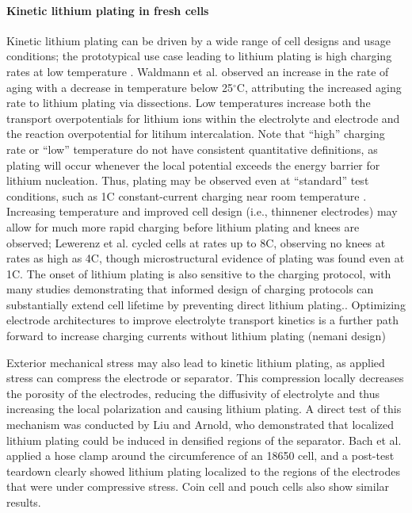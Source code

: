 \documentclass[journal=jpcl, manuscript=article, layout=onecolumn]{achemso}
\begin{document}
\paragraph{Kinetic lithium plating in fresh cells}
Kinetic lithium plating can be driven by a wide range of cell designs and usage conditions; the prototypical use case leading to lithium plating is high charging rates at low temperature \cite{waldmann_temperature_2014, petzl_lithium_2015}. Waldmann et al.\cite{waldmann_temperature_2014} observed an increase in the rate of aging with a decrease in temperature below 25$^{\circ}$C, attributing the increased aging rate to lithium plating via dissections. Low temperatures increase both the transport overpotentials for lithium ions within the electrolyte and electrode and the reaction overpotential for litihum intercalation. Note that ``high'' charging rate or ``low'' temperature do not have consistent quantitative definitions, as plating will occur whenever the local potential exceeds the energy barrier for lithium nucleation. Thus, plating may be observed even at ``standard'' test conditions, such as 1C constant-current charging near room temperature \cite{waldmann_optimization_2015,burns_-situ_2015}. Increasing temperature and improved cell design (i.e., thinnener electrodes) may allow for much more rapid charging before lithium plating and knees are observed; Lewerenz et al.\cite{lewerenz_systematic_2017} cycled cells at rates up to 8C, observing no knees at rates as high as 4C, though microstructural evidence of plating was found even at 1C. The onset of lithium plating is also sensitive to the charging protocol, with many studies demonstrating that informed design of charging protocols can substantially extend cell lifetime by preventing direct lithium plating.\cite{waldmann_optimization_2015,schindler_fast_2018}. Optimizing electrode architectures to improve electrolyte transport kinetics is a further path forward to increase charging currents without lithium plating \cite{usseglio-viretta_enabling_2020} (nemani design)

Exterior mechanical stress may also lead to kinetic lithium plating, as applied stress can compress the electrode or separator. This compression locally decreases the porosity of the electrodes, reducing the diffusivity of electrolyte and thus increasing the local polarization and causing lithium plating. A direct test of this mechanism was conducted by Liu and Arnold\cite{liu_effects_2020}, who demonstrated that localized lithium plating could be induced in densified regions of the separator. Bach et al.\cite{bach_nonlinear_2016} applied a hose clamp around the circumference of an 18650 cell, and a post-test teardown clearly showed lithium plating localized to the regions of the electrodes that were under compressive stress. Coin cell and pouch cells also show similar results.\cite{liu_size_2018, fuchs_post-mortem_2019, okasinski_situ_2020}
\end{document}
